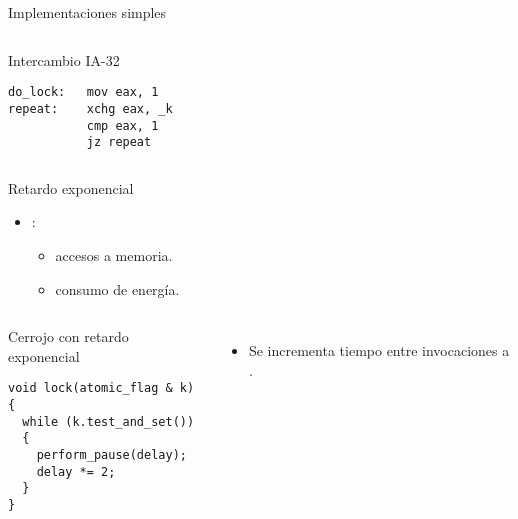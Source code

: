 \begin{frame}[t,fragile]{Implementaciones simples}

\begin{columns}[T]


\begin{block}{Intercambio IA-32}
\begin{lstlisting}[language={[x86masm]Assembler}]
do_lock:   mov eax, 1
repeat:    xchg eax, _k
           cmp eax, 1
           jz repeat
\end{lstlisting}
\end{block}

\end{columns}

\end{frame}

\begin{frame}[t,fragile]{Retardo exponencial}
\begin{itemize}
  \item {}:
    \begin{itemize}
      \item {} accesos a memoria.
      \item {} consumo de energía.
    \end{itemize}
\end{itemize}


\begin{columns}

\begin{block}{Cerrojo con retardo exponencial}
\begin{lstlisting}
void lock(atomic_flag & k) {
  while (k.test_and_set())
  {
    perform_pause(delay);
    delay *= 2;
  }
}
\end{lstlisting}
\end{block}


\begin{itemize}
  \item Se incrementa  tiempo entre invocaciones a
        .
\end{itemize}

\end{columns}

\end{frame}


